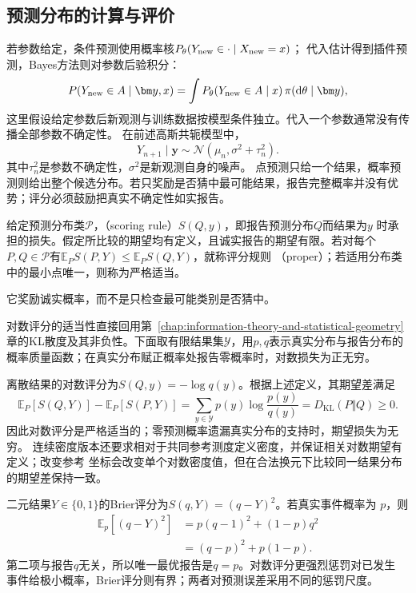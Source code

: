 \subsection{预测分布的计算与评价}
\label{sec:statistics-scoring-calibration}
若参数给定，条件预测使用概率核\(P_\theta(Y_{\rm new}\in\cdot\mid X_{\rm new}=x)\)；
代入估计得到插件预测，Bayes方法则对参数后验积分：
\[
P(Y_{\rm new}\in A\mid\bm y,x)
=\int P_\theta(Y_{\rm new}\in A\mid x)\,\pi(\mathrm d\theta\mid\bm y),
\]
这里假设给定参数后新观测与训练数据按模型条件独立。代入一个参数通常没有传播全部参数不确定性。
在前述高斯共轭模型中，
\[
  Y_{n+1}\mid\bm y
  \sim\mathcal N(\mu_n,\sigma^2+\tau_n^2).
\]
其中\(\tau_n^2\)是参数不确定性，\(\sigma^2\)是新观测自身的噪声。
点预测只给一个结果，概率预测则给出整个候选分布。若只奖励是否猜中最可能结果，报告完整概率并没有优势；评分必须鼓励把真实不确定性如实报告。
\begin{definition}[适当评分规则]
  \label{def:statistics-proper-scoring-rule}
  给定预测分布类\(\mathcal P\)，（scoring rule）\(S(Q,y)\)，即报告预测分布\(Q\)而结果为\(y\)
时承担的损失。假定所比较的期望均有定义，且诚实报告的期望有限。若对每个\(P,Q\in\mathcal P\)有\(\mathbb E_PS(P,Y)\leq\mathbb E_PS(Q,Y)\)，就称评分规则
（proper）；若适用分布类中的最小点唯一，则称为严格适当。
\end{definition}
它奖励诚实概率，而不是只检查最可能类别是否猜中。

对数评分的适当性直接回用第~\ref{chap:information-theory-and-statistical-geometry}章的KL散度及其非负性。下面取有限结果集\(\mathcal Y\)，用\(p,q\)表示真实分布与报告分布的概率质量函数；在真实分布赋正概率处报告零概率时，对数损失为正无穷。

离散结果的对数评分为\(S(Q,y)=-\log q(y)\)。根据上述定义，其期望差满足
\[
  \mathbb{E}_P[S(Q,Y)]-\mathbb{E}_P[S(P,Y)]
  =\sum_{y\in\mathcal Y}p(y)\log\frac{p(y)}{q(y)}
  =D_{\mathrm{KL}}(P\Vert Q)\geq0.
\]
因此对数评分是严格适当的；零预测概率遗漏真实分布的支持时，期望损失为无穷。
连续密度版本还要求相对于共同参考测度定义密度，并保证相关对数期望有定义；改变参考
坐标会改变单个对数密度值，但在合法换元下比较同一结果分布的期望差保持一致。

二元结果\(Y\in\{0,1\}\)的Brier评分为\(S(q,Y)=(q-Y)^2\)。若真实事件概率为
\(p\)，则
\begin{align}
  \mathbb{E}_p[(q-Y)^2]
  &=p(q-1)^2+(1-p)q^2\\
  &=(q-p)^2+p(1-p).
\end{align}
第二项与报告\(q\)无关，所以唯一最优报告是\(q=p\)。对数评分更强烈惩罚对已发生
事件给极小概率，Brier评分则有界；两者对预测误差采用不同的惩罚尺度。


